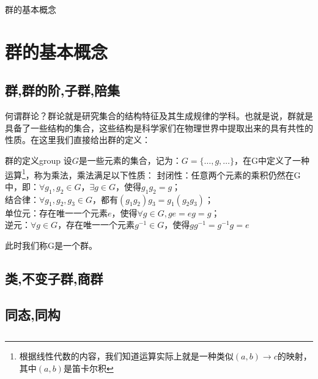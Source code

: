\begin{introduction}
    \item 群的基本概念
\end{introduction}

\section{群的基本概念}
\subsection{群,群的阶,子群,陪集}
    何谓群论？群论就是研究集合的结构特征及其生成规律的学科。也就是说，群就是具备了一些结构的集合，这些结构是科学家们在物理世界中提取出来的具有共性的性质。在这里我们直接给出群的定义：
    \begin{definition}{群的定义}{group}
        设$G$是一些元素的集合，记为：$G=\{\dots,g,\dots\}$，在G中定义了一种运算\footnote{根据线性代数的内容，我们知道运算实际上就是一种类似$(a,b)\rightarrow c$的映射，其中$(a,b)$是笛卡尔积}，称为乘法，乘法满足以下性质：
        封闭性：任意两个元素的乘积仍然在G中，即：$\forall g_1,g_2\in G，\exists g\in G$，使得$g_1g_2=g$；\\
        结合律：$\forall g_1,g_2,g_3\in G$，都有$(g_1g_2)g_3=g_1(g_2g_3)$；\\
        单位元：存在唯一一个元素$e$，使得$\forall g\in G,ge=eg=g$；\\
        逆元：$\forall g\in G$，存在唯一一个元素$g^{-1}\in G$，使得$gg^{-1}=g^{-1}g=e$
        
        此时我们称G是一个群。
    \end{definition}
\subsection{类,不变子群,商群}

\subsection{同态,同构}
\subsection{}
